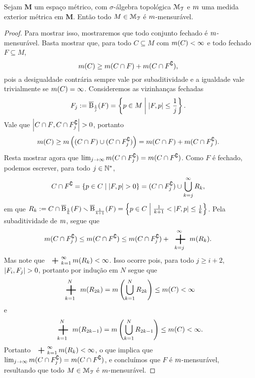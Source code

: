 \begin{proposition}
\label{prop:criterio.mensur.med.metrica}
Sejam $\bm M$ um espaço métrico, com $\sigma$-álgebra topológica $\mathcal{M}_{\mathcal{T}}$ e $m$ uma medida exterior métrica em $\bm M$. Então todo $M \in \mathcal{M}_{\mathcal{T}}$ é $m$-mensurável.
\end{proposition}
\begin{proof}
Para mostrar isso, mostraremos que todo conjunto fechado é $m$-mensurável. Basta mostrar que, para todo $C \subseteq M$ com $m(C) < \infty$ e todo fechado $F \subseteq M$,
	\begin{equation*}
	m(C) \geq m(C \cap F) + m(C \cap F^\complement),
	\end{equation*}
pois a desigualdade contrária sempre vale por subaditividade e a igualdade vale trivialmente se $m(C) = \infty$. Consideremos as vizinhanças fechadas
	\begin{equation*}
	F_j := \overline{\mathrm{B}}_{\frac{1}{j}}(F) = \left\{{p \in M}\;\middle\vert\;{\left\vert{F},{p}\right\vert \leq \frac{1}{j}}\right\}.
	\end{equation*}
Vale que $\left\vert{C \cap F},{C \cap F_j^\complement}\right\vert > 0$, portanto
	\begin{equation*}
	m(C) \geq m\left( (C \cap F) \cup (C \cap F_j^\complement) \right) = m(C \cap F) + m(C \cap F_j^\complement).
	\end{equation*}
Resta mostrar agora que $\lim_{j \rightarrow \infty} m(C \cap F_j^\complement) = m(C \cap F^\complement)$. Como $F$ é fechado, podemos escrever, para todo $j \in \mathbb{N}^*$,
	\begin{equation*}
	C \cap F^\complement = \left\{{p \in C}\;\middle\vert\;{\left\vert{F},{p}\right\vert > 0}\right\} = (C \cap F_j^\complement) \cup \bigcup_{k=j}^\infty R_k,
	\end{equation*}
em que $R_k := C \cap \overline{\mathrm{B}}_{\frac{1}{k}}(F) \smallsetminus \overline{\mathrm{B}}_{\frac{1}{k+1}}(F) = \left\{{p \in C}\;\middle\vert\;{\frac{1}{k+1} < \left\vert{F},{p}\right\vert \leq \frac{1}{k}}\right\}$. Pela subaditividade de $m$, segue que
	\begin{equation*}
	\med(C \cap F_j^\complement) \leq \med(C \cap F^\complement) \leq \med(C \cap F_j^\complement) + \sum_{k=j}^\infty \med(R_k).
	\end{equation*}
Mas note que $\sum_{k=1}^\infty \med(R_k) < \infty$. Isso ocorre pois, para todo $j \geq i+2$, $\left\vert{F_i},{F_j}\right\vert > 0$, portanto por indução em $N$ segue que
	\begin{equation*}
	\sum_{k=1}^N \med(R_{2k}) = \med\left( \bigcup_{k=1}^N R_{2k} \right) \leq \med(C) < \infty
	\end{equation*}
e
	\begin{equation*}
	\sum_{k=1}^N \med(R_{2k-1}) = \med\left( \bigcup_{k=1}^N R_{2k-1} \right) \leq \med(C) < \infty.
	\end{equation*}
Portanto $\sum_{k=1}^\infty \med(R_k) < \infty$, o que implica que $\lim_{j \rightarrow \infty} m(C \cap F_j^\complement) = m(C \cap F^\complement)$, e concluímos que $F$ é $m$-mensurável, resultando que todo $M \in \mathcal{M}_{\mathcal{T}}$ é $m$-mensurável.
\end{proof}

